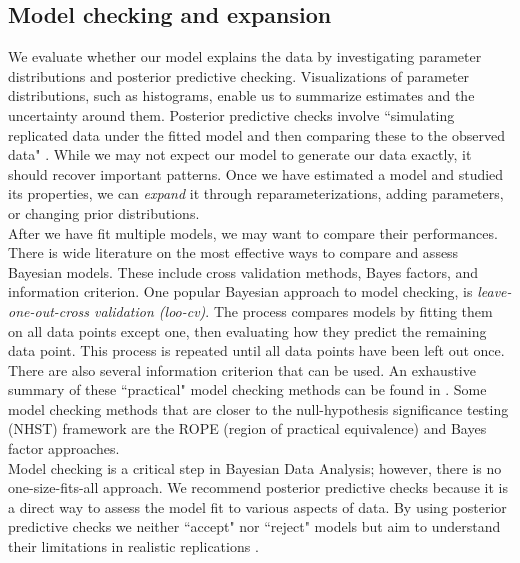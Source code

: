 \documentclass{article}
\begin{document}
\subsection*{Model checking and expansion}
We evaluate whether our model explains the data by investigating parameter distributions and posterior predictive checking.  Visualizations of parameter distributions, such as histograms, enable us to summarize estimates and the uncertainty around them.  Posterior predictive checks involve ``simulating replicated data under the fitted model and then comparing these to the observed data" \cite[p. ~158]{gelman2006data}.  While we may not expect our model to generate our data exactly, it should recover important patterns.  Once we have estimated a model and studied its properties, we can \emph{expand} it through reparameterizations, adding parameters, or changing prior distributions. \\
After we have fit multiple models, we may want to compare their performances. There is wide literature on the most effective ways to compare and assess Bayesian models. These include cross validation methods, Bayes factors, and information criterion. One popular Bayesian approach to model checking, is \textit{leave-one-out-cross validation (loo-cv)}. The process compares models by fitting them on all data points except one, then evaluating how they predict the remaining data point. This process is repeated until all data points have been left out once. There are also several information criterion that can be used. An exhaustive summary of these ``practical" model checking methods can be found in . Some model checking methods that are closer to the null-hypothesis significance testing (NHST) framework are the ROPE (region of practical equivalence)\cite{kruschke2014doing} and Bayes factor \cite{rouder2009bayesian} approaches. \\
Model checking is a critical step in Bayesian Data Analysis; however, there is no one-size-fits-all approach.  We recommend posterior predictive checks because it is a direct way to assess the model fit to various aspects of data. By using posterior predictive checks we neither ``accept" nor ``reject" models but aim to understand their limitations in realistic replications \cite{gelman2014bayesian}.
\end{document}
